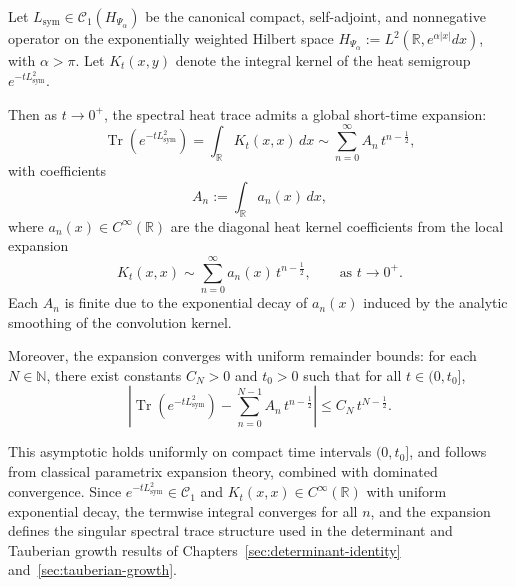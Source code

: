 \begin{proposition}
\label{prop:heat_trace_uniform_conv}
Let \( L_{\mathrm{sym}} \in \mathcal{C}_1(H_{\Psi_\alpha}) \) be the canonical compact, self-adjoint, and nonnegative operator on the exponentially weighted Hilbert space \( H_{\Psi_\alpha} := L^2(\mathbb{R}, e^{\alpha|x|} dx) \), with \( \alpha > \pi \). Let \( K_t(x,y) \) denote the integral kernel of the heat semigroup \( e^{-t L_{\mathrm{sym}}^2} \).

Then as \( t \to 0^+ \), the spectral heat trace admits a global short-time expansion:
\[
\operatorname{Tr}(e^{-t L_{\mathrm{sym}}^2}) = \int_{\mathbb{R}} K_t(x,x)\, dx
\sim \sum_{n=0}^\infty A_n\, t^{n - \frac{1}{2}},
\]
with coefficients
\[
A_n := \int_{\mathbb{R}} a_n(x)\, dx,
\]
where \( a_n(x) \in C^\infty(\mathbb{R}) \) are the diagonal heat kernel coefficients from the local expansion
\[
K_t(x,x) \sim \sum_{n=0}^\infty a_n(x)\, t^{n - \frac{1}{2}}, \qquad \text{as } t \to 0^+.
\]
Each \( A_n \) is finite due to the exponential decay of \( a_n(x) \) induced by the analytic smoothing of the convolution kernel.

\medskip
\noindent
Moreover, the expansion converges with uniform remainder bounds: for each \( N \in \mathbb{N} \), there exist constants \( C_N > 0 \) and \( t_0 > 0 \) such that for all \( t \in (0, t_0] \),
\[
\left| \operatorname{Tr}(e^{-t L_{\mathrm{sym}}^2}) - \sum_{n=0}^{N-1} A_n\, t^{n - \frac{1}{2}} \right| \leq C_N\, t^{N - \frac{1}{2}}.
\]

\medskip
\noindent
This asymptotic holds uniformly on compact time intervals \( (0, t_0] \), and follows from classical parametrix expansion theory, combined with dominated convergence. Since \( e^{-t L_{\mathrm{sym}}^2} \in \mathcal{C}_1 \) and \( K_t(x,x) \in C^\infty(\mathbb{R}) \) with uniform exponential decay, the termwise integral converges for all \( n \), and the expansion defines the singular spectral trace structure used in the determinant and Tauberian growth results of Chapters~\ref{sec:determinant-identity} and~\ref{sec:tauberian-growth}.
\end{proposition}
